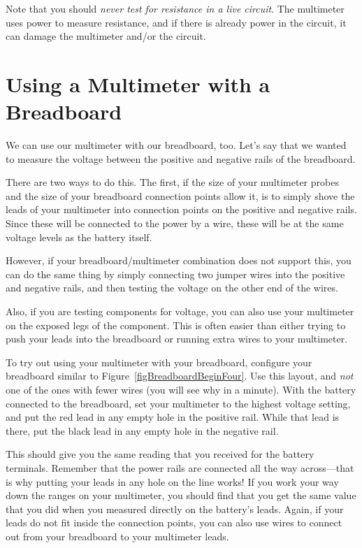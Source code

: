 Note that you should \emph{never test for resistance in a live circuit}.
The multimeter uses power to measure resistance, and if there is already power in the circuit, it can damage the multimeter and/or the circuit.

\section{Using a Multimeter with a Breadboard}

We can use our multimeter with our breadboard, too.
Let's say that we wanted to measure the voltage between the positive and negative rails of the breadboard.

There are two ways to do this.
The first, if the size of your multimeter probes and the size of your breadboard connection points allow it, is to simply shove the leads of your multimeter into connection points on the positive and negative rails.
Since these will be connected to the power by a wire, these will be at the same voltage levels as the battery itself.

However, if your breadboard/multimeter combination does not support this, you can do the same thing by simply connecting two jumper wires into the positive and negative rails, and then testing the voltage on the other end of the wires.  

Also, if you are testing components for voltage, you can also use your multimeter on the exposed legs of the component.
This is often easier than either trying to push your leads into the breadboard or running extra wires to your multimeter.

To try out using your multimeter with your breadboard, configure your breadboard similar to Figure~\ref{figBreadboardBeginFour}.  
Use this layout, and \emph{not} one of the ones with fewer wires (you will see why in a minute).
With the battery connected to the breadboard, set your multimeter to the highest voltage setting, and put the red lead in any empty hole in the positive rail.
While that lead is there, put the black lead in any empty hole in the negative rail.

This should give you the same reading that you received for the battery terminals.
Remember that the power rails are connected all the way across---that is why putting your leads in any hole on the line works!
If you work your way down the ranges on your multimeter, you should find that you get the same value that you did when you measured directly on the battery's leads.
Again, if your leads do not fit inside the connection points, you can also use wires to connect out from your breadboard to your multimeter leads.

